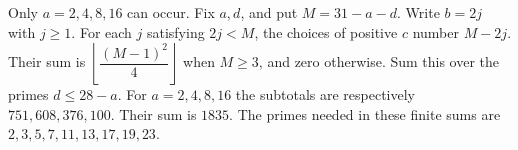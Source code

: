 Only $a=2,4,8,16$ can occur. Fix $a,d$, and put $M=31-a-d$. Write $b=2j$ with $j\ge1$. For each $j$ satisfying $2j<M$, the choices of positive $c$ number $M-2j$. Their sum is $\left\lfloor\dfrac{(M-1)^2}{4}\right\rfloor$ when $M\ge3$, and zero otherwise. Sum this over the primes $d\le28-a$. For $a=2,4,8,16$ the subtotals are respectively $751,608,376,100$. Their sum is $\boxed{1835}$. The primes needed in these finite sums are $2,3,5,7,11,13,17,19,23$.
